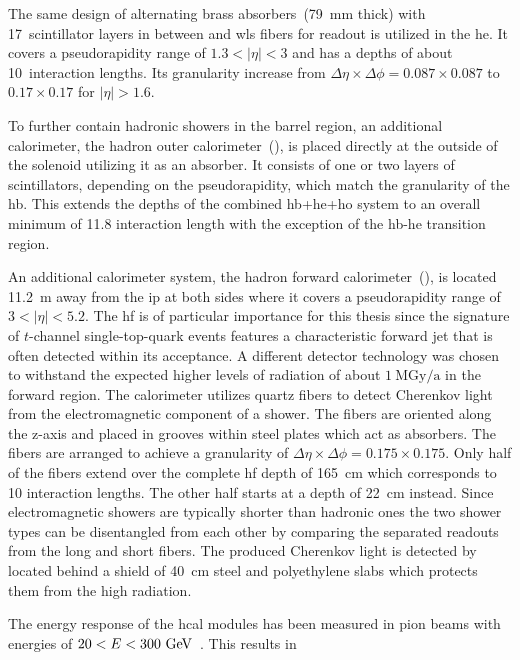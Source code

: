 The same design of alternating brass absorbers~(79~mm thick) with 17~scintillator layers in between and \gls{wls} fibers for readout is utilized in the \gls{he}. It covers a pseudorapidity range of $1.3<|\eta|<3$ and has a depths of about 10~interaction lengths. Its granularity increase from $\Delta\eta\times\Delta\phi=0.087\times0.087$ to $0.17\times0.17$ for $|\eta|>1.6$.

To further contain hadronic showers in the barrel region, an additional calorimeter, the hadron outer calorimeter~(), is placed directly at the outside of the solenoid utilizing it as an absorber. It consists of one or two layers of scintillators, depending on the pseudorapidity, which match the granularity of the \gls{hb}. This extends the depths of the combined \gls{hb}+\gls{he}+\gls{ho} system to an overall minimum of 11.8 interaction length with the exception of the \gls{hb}-\gls{he} transition region.

An additional calorimeter system, the hadron forward calorimeter~(), is located 11.2~m away from the \gls{ip} at both sides where it covers a pseudorapidity range of $3<|\eta|<5.2$. The \gls{hf} is of particular importance for this thesis since the signature of $t$-channel single-top-quark events features a characteristic forward jet that is often detected within its acceptance. A different detector technology was chosen to withstand the expected higher levels of radiation of about $1~\mathrm{MGy/a}$ in the forward region. The calorimeter utilizes quartz fibers to detect Cherenkov light from the electromagnetic component of a shower. The fibers are oriented along the z-axis and placed in grooves within steel plates which act as absorbers. The fibers are arranged to achieve a granularity of $\Delta\eta\times\Delta\phi=0.175\times0.175$. Only half of the fibers extend over the complete \gls{hf} depth of 165~cm which corresponds to 10 interaction lengths. The other half starts at a depth of 22~cm instead. Since electromagnetic showers are typically shorter than hadronic ones the two shower types can be disentangled from each other by comparing the separated readouts from the long and short fibers. The produced Cherenkov light is detected by  located behind a shield of 40~cm steel and polyethylene slabs which protects them from the high radiation.

The energy response of the \gls{hcal} modules has been measured in pion beams with energies of $20<E<300~\textrm{GeV}$~\cite{Baiatian:1049915}. This results in 

